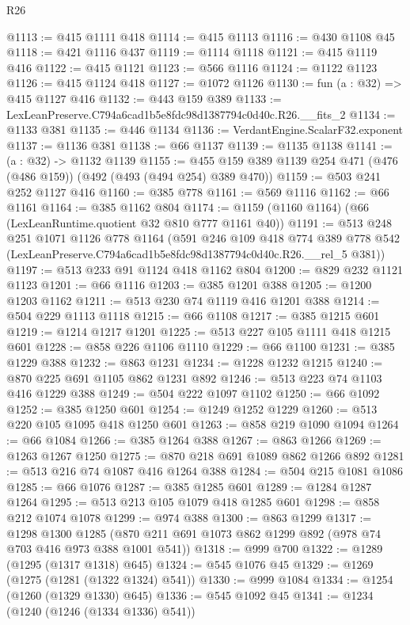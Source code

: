 \begin{lexlean}{R26}
\begin{coremodule}
@1113 := @415 @1111 @418
@1114 := @415 @1113
@1116 := @430 @1108 @45
@1118 := @421 @1116 @437
@1119 := @1114 @1118
@1121 := @415 @1119 @416
@1122 := @415 @1121
@1123 := @566 @1116
@1124 := @1122 @1123
@1126 := @415 @1124 @418
@1127 := @1072 @1126
@1130 := fun (a : @32) => @415 @1127 @416
@1132 := @443 @159 @389
@1133 := LexLeanPreserve.C794a6cad1b5e8fdc98d1387794c0d40c.R26.__fits_2
@1134 := @1133 @381
@1135 := @446 @1134
@1136 := VerdantEngine.ScalarF32.exponent
@1137 := @1136 @381
@1138 := @66 @1137
@1139 := @1135 @1138
@1141 := (a : @32) -> @1132 @1139
@1155 := @455 @159 @389 @1139 @254 @471 (@476 (@486 @159)) (@492 (@493 (@494 @254) @389 @470))
@1159 := @503 @241 @252 @1127 @416
@1160 := @385 @778
@1161 := @569 @1116
@1162 := @66 @1161
@1164 := @385 @1162 @804
@1174 := @1159 (@1160 @1164) (@66 (LexLeanRuntime.quotient @32 @810 @777 @1161 @40))
@1191 := @513
    @248
    @251
    @1071
    @1126
    @778
    @1164
    (@591
      @246
      @109
      @418
      @774
      @389
      @778
      @542
      (LexLeanPreserve.C794a6cad1b5e8fdc98d1387794c0d40c.R26.__rel_5 @381))
@1197 := @513 @233 @91 @1124 @418 @1162 @804
@1200 := @829 @232 @1121 @1123
@1201 := @66 @1116
@1203 := @385 @1201 @388
@1205 := @1200 @1203 @1162
@1211 := @513 @230 @74 @1119 @416 @1201 @388
@1214 := @504 @229 @1113 @1118
@1215 := @66 @1108
@1217 := @385 @1215 @601
@1219 := @1214 @1217 @1201
@1225 := @513 @227 @105 @1111 @418 @1215 @601
@1228 := @858 @226 @1106 @1110
@1229 := @66 @1100
@1231 := @385 @1229 @388
@1232 := @863 @1231
@1234 := @1228 @1232 @1215
@1240 := @870 @225 @691 @1105 @862 @1231 @892
@1246 := @513 @223 @74 @1103 @416 @1229 @388
@1249 := @504 @222 @1097 @1102
@1250 := @66 @1092
@1252 := @385 @1250 @601
@1254 := @1249 @1252 @1229
@1260 := @513 @220 @105 @1095 @418 @1250 @601
@1263 := @858 @219 @1090 @1094
@1264 := @66 @1084
@1266 := @385 @1264 @388
@1267 := @863 @1266
@1269 := @1263 @1267 @1250
@1275 := @870 @218 @691 @1089 @862 @1266 @892
@1281 := @513 @216 @74 @1087 @416 @1264 @388
@1284 := @504 @215 @1081 @1086
@1285 := @66 @1076
@1287 := @385 @1285 @601
@1289 := @1284 @1287 @1264
@1295 := @513 @213 @105 @1079 @418 @1285 @601
@1298 := @858 @212 @1074 @1078
@1299 := @974 @388
@1300 := @863 @1299
@1317 := @1298
    @1300
    @1285
    (@870 @211 @691 @1073 @862 @1299 @892 (@978 @74 @703 @416 @973 @388 @1001 @541))
@1318 := @999 @700
@1322 := @1289 (@1295 (@1317 @1318) @645)
@1324 := @545 @1076 @45
@1329 := @1269 (@1275 (@1281 (@1322 @1324) @541))
@1330 := @999 @1084
@1334 := @1254 (@1260 (@1329 @1330) @645)
@1336 := @545 @1092 @45
@1341 := @1234 (@1240 (@1246 (@1334 @1336) @541))

\end{coremodule}
\end{lexlean}
